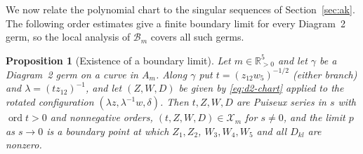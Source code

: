 \documentclass[Threeside,11pt]{article}
\newtheorem{proposition}[theorem]{Proposition}
\theoremstyle{definition}
\theoremstyle{remark}
\numberwithin{equation}{section}
\theoremstyle{remark}
\newcommand{\Rp}{\mathbb{R}_{>0}}
\newcommand{\ord}{\operatorname{ord}}
\begin{document}
We now relate the polynomial chart to the singular sequences of Section~\ref{sec:ak}.
The following order estimates give a finite boundary limit for every Diagram~2 germ,
so the local analysis of $\mathcal B_m$ covers all such germs.

\begin{proposition}[Existence of a boundary limit]\label{prop:d2-cover}
Let $m\in\Rp^5$ and let $\gamma$ be a Diagram~2 germ on a curve in $A_m$.  Along $\gamma$ put
$t=(z_{12}w_5)^{-1/2}$ \textup{(}either branch\textup{)} and $\lambda=(tz_{12})^{-1}$, and let
$(Z,W,D)$ be given by \eqref{eq:d2-chart} applied to the rotated configuration
$(\lambda z,\lambda^{-1}w,\delta)$.  Then $t,Z,W,D$ are Puiseux series in $s$ with $\ord t>0$ and
nonnegative orders, $(t,Z,W,D)\in\mathcal X_m$ for $s\ne0$, and the limit $p$ as $s\to0$ is a boundary point at
which $Z_1,Z_2$, $W_3,W_4,W_5$ and all $D_{kl}$ are nonzero.
\end{proposition}
\end{document}
